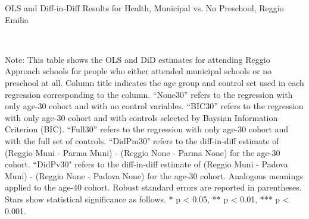 \begin{landscape}

\begin{table}[H] \caption{OLS and Diff-in-Diff Results for Health, Municipal vs. No Preschool, Reggio Emilia} \label{ols-H-reg}
\scalebox{0.85}{
}
\vspace{1ex} \\
\footnotesize\raggedright{Note: This table shows the OLS and DiD estimates for attending Reggio Approach schools for people who either attended municipal schools or no preschool at all. Column title indicates the age group and control set used in each regression corresponding to the column. ``None30'' refers to the regression with only age-30 cohort and with no control variables. ``BIC30'' refers to the regression with only age-30 cohort and with controls selected by Baysian Information Criterion (BIC). ``Full30'' refers to the regression with only age-30 cohort and with the full set of controls. ``DidPm30" refers to the diff-in-diff estimate of (Reggio Muni - Parma Muni) - (Reggio None - Parma None) for the age-30 cohort. ``DidPv30" refers to the diff-in-diff estimate of (Reggio Muni - Padova Muni) - (Reggio None - Padova None) for the age-30 cohort. Analogous meanings applied to the age-40 cohort. Robust standard errors are reported in parentheses. Stars show statistical significance as follows. * p < 0.05, ** p < 0.01, *** p < 0.001.}
\end{table}




\end{landscape}
